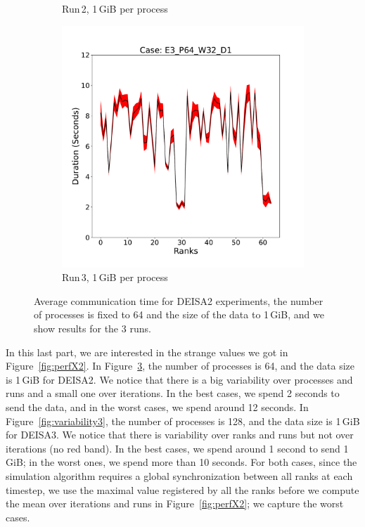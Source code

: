\begin{figure}[h!]
\begin{subfigure}[b]{0.3\textwidth}
         \caption{Run\,2, 1\,GiB per process}
         \label{fig:E2_1_d22}
     \end{subfigure}
      \hfill
     \begin{subfigure}[b]{0.3\textwidth}
         \centering
         \includegraphics[width=\textwidth, height=\textwidth]{figures/deisa2__E3_P64_W32_D1.pdf}
         \caption{Run\,3, 1\,GiB per process}
         \label{fig:E3_1_d22}
     \end{subfigure}
        \caption{Average communication time for DEISA2 experiments, the number of processes is fixed to 64 and the size of the data to 1\,GiB, and we show results for the 3 runs.}
        \label{fig:variability222}
\end{figure}


In this last part, we are interested in the strange values we got in Figure~\ref{fig:perfX2}.
In Figure~\ref{fig:variability222}, the number of processes is 64, and the data size is 1\,GiB for DEISA2. We notice that there is a big variability over processes and runs and a small one over iterations. In the best cases, we spend 2 seconds to send the data, and in the worst cases, we spend around 12 seconds.  
In Figure~\ref{fig:variability3}, the number of processes is 128, and the data size is 1\,GiB for DEISA3. We notice that there is variability over ranks and runs but not over iterations (no red band). In the best cases, we spend around 1 second to send 1\,GiB; in the worst ones, we spend more than 10 seconds.
For both cases, since the simulation algorithm requires a global synchronization between all ranks at each timestep,
we use the maximal value registered by all the ranks before we compute the mean over iterations and runs in Figure~\ref{fig:perfX2}; we capture the worst cases. 

